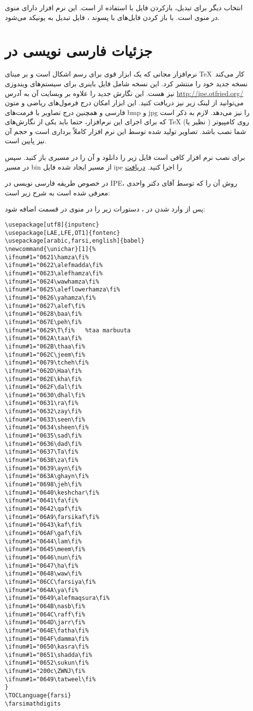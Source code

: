 انتخاب دیگر برای تبدیل، بازکردن فایل با استفاده از  است. این نرم افزار دارای منوی  در منوی  است. با باز کردن فایل‌های با پسوند ، فایل تبدیل  به یونیکد می‌شود.
\section{جزئیات فارسی نویسی در }
نرم‌افزار مجانی  که یک ابزار قوی برای رسم اشکال است و بر مبنای \TeX\ کار می‌کند 
نسخه جدید خود را منتشر کرد. این نسخه شامل فایل باینری برای سیستم‌های ویندوزی نیز هست. این نگارش 
جدید را علاوه بر وبسایت آن به آدرس \url{http://ipe.otfried.org/}
  می‌توانید از لینک زیر نیز دریافت کنید. این ابزار امکان درج فرمول‌های ریاضی و متون فارسی و همچنین درج تصاویر 
  با فرمت‌های bmp  و jpg  را نیز می‌دهد. لازم به ذکر است که برای اجرای این نرم‌افزار، حتما باید یکی از نگارش‌های TeX
  (نظیر   یا ) روی کامپیوتر شما نصب باشد. تصاویر تولید شده توسط این
  نرم افزار کاملاً برداری  است و حجم آن نیز پایین است.

  برای نصب نرم افزار کافی است فایل زیر را دانلود و آن را در مسیری باز کنید. سپس در
  مسیر bin از مسیر ایجاد شده فایل ipe را اجرا کنید. 
\href{http://bayanbox.ir/download/6365189354713376578/ipe-7.1.8-win.zip}{  دریافت }

  در خصوص طریقه فارسی نویسی در IPE، روش آن را که توسط آقای دکتر واحدی معرفی شده است به شرح زیر است:

پس از وارد شدن در ، دستورات زیر را در منوی   در قسمت
 اضافه شود:

{\tiny
\latin
\begin{verbatim}
\usepackage[utf8]{inputenc}
\usepackage[LAE,LFE,OT1]{fontenc}
\usepackage[arabic,farsi,english]{babel}
\newcommand{\unichar}[1]{%
\ifnum#1="0621\hamza\fi%
\ifnum#1="0622\alefmadda\fi%
\ifnum#1="0623\alefhamza\fi%
\ifnum#1="0624\wawhamza\fi%
\ifnum#1="0625\aleflowerhamza\fi%
\ifnum#1="0626\yahamza\fi%
\ifnum#1="0627\alef\fi%
\ifnum#1="0628\baa\fi%
\ifnum#1="067E\peh\fi%
\ifnum#1="0629\T\fi%   %taa marbuuta
\ifnum#1="062A\taa\fi%
\ifnum#1="062B\thaa\fi%
\ifnum#1="062C\jeem\fi%
\ifnum#1="0679\tcheh\fi%  
\ifnum#1="062D\Haa\fi%
\ifnum#1="062E\kha\fi%
\ifnum#1="062F\dal\fi%
\ifnum#1="0630\dhal\fi%
\ifnum#1="0631\ra\fi%
\ifnum#1="0632\zay\fi%
\ifnum#1="0633\seen\fi%
\ifnum#1="0634\sheen\fi%
\ifnum#1="0635\sad\fi%
\ifnum#1="0636\dad\fi%
\ifnum#1="0637\Ta\fi%
\ifnum#1="0638\za\fi%
\ifnum#1="0639\ayn\fi%
\ifnum#1="063A\ghayn\fi%
\ifnum#1="0698\jeh\fi%
\ifnum#1="0640\keshchar\fi%
\ifnum#1="0641\fa\fi%
\ifnum#1="0642\qaf\fi%
\ifnum#1="06A9\farsikaf\fi%
\ifnum#1="0643\kaf\fi%
\ifnum#1="06AF\gaf\fi%
\ifnum#1="0644\lam\fi%
\ifnum#1="0645\meem\fi%
\ifnum#1="0646\nun\fi%
\ifnum#1="0647\ha\fi%
\ifnum#1="0648\waw\fi%
\ifnum#1="06CC\farsiya\fi%
\ifnum#1="064A\ya\fi%
\ifnum#1="0649\alefmaqsura\fi%
\ifnum#1="064B\nasb\fi%
\ifnum#1="064C\raff\fi%
\ifnum#1="064D\jarr\fi%
\ifnum#1="064E\fatha\fi%
\ifnum#1="064F\damma\fi%
\ifnum#1="0650\kasra\fi%
\ifnum#1="0651\shadda\fi%
\ifnum#1="0652\sukun\fi%
\ifnum#1="200c\ZWNJ\fi%
\ifnum#1="0649\tatweel\fi%
}
\TOCLanguage{farsi}
\farsimathdigits
\end{verbatim}
}
\persian


